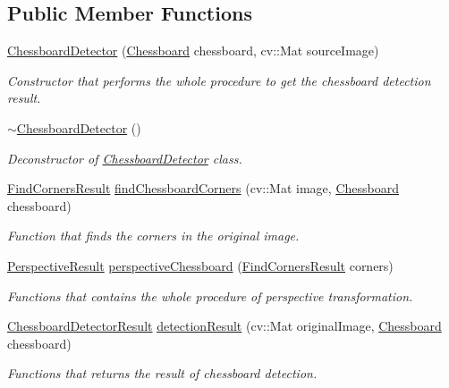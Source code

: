\subsection*{Public Member Functions}
\begin{DoxyCompactItemize}
\item 
\hyperlink{class_chessboard_detector_aebbd98195c5f2b06ca0f10fb65d9211e}{Chessboard\+Detector} (\hyperlink{class_chessboard}{Chessboard} chessboard, cv\+::\+Mat source\+Image)
\begin{DoxyCompactList}\small\item\em Constructor that performs the whole procedure to get the chessboard detection result. \end{DoxyCompactList}\item 
\hyperlink{class_chessboard_detector_a7db4aa40348c01899ac8be7a959d1f77}{$\sim$\+Chessboard\+Detector} ()
\begin{DoxyCompactList}\small\item\em Deconstructor of \hyperlink{class_chessboard_detector}{Chessboard\+Detector} class. \end{DoxyCompactList}\item 
\hyperlink{struct_find_corners_result}{Find\+Corners\+Result} \hyperlink{class_chessboard_detector_a4d0df2c6479f32286935577e1b0fca41}{find\+Chessboard\+Corners} (cv\+::\+Mat image, \hyperlink{class_chessboard}{Chessboard} chessboard)
\begin{DoxyCompactList}\small\item\em Function that finds the corners in the original image. \end{DoxyCompactList}\item 
\hyperlink{struct_perspective_result}{Perspective\+Result} \hyperlink{class_chessboard_detector_a591172112aeddde99db0f3dafda05b89}{perspective\+Chessboard} (\hyperlink{struct_find_corners_result}{Find\+Corners\+Result} corners)
\begin{DoxyCompactList}\small\item\em Functions that contains the whole procedure of perspective transformation. \end{DoxyCompactList}\item 
\hyperlink{struct_chessboard_detector_result}{Chessboard\+Detector\+Result} \hyperlink{class_chessboard_detector_a97550158d545864e639f0a6311f56f16}{detection\+Result} (cv\+::\+Mat original\+Image, \hyperlink{class_chessboard}{Chessboard} chessboard)
\begin{DoxyCompactList}\small\item\em Functions that returns the result of chessboard detection. \end{DoxyCompactList}\item 

\end{DoxyCompactItemize}
